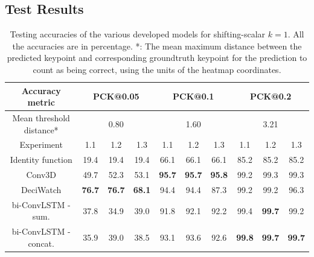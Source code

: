 \documentclass[./main.tex]{subfiles}
\begin{document}
\subsection{Test Results}
\begin{table}[htbp]
    \begin{tabular}{c||ccc|ccc|ccc}
        \hline
        Accuracy metric & \multicolumn{3}{c}{PCK@0.05} & \multicolumn{3}{c}{PCK@0.1} & \multicolumn{3}{c}{PCK@0.2} \\
        \hline
        Mean threshold distance* & \multicolumn{3}{c}{0.80} & \multicolumn{3}{c}{1.60} & \multicolumn{3}{c}{3.21} \\
        \hline
        Experiment & 1.1 & 1.2 & 1.3 & 1.1 & 1.2 & 1.3 & 1.1 & 1.2 & 1.3 \\
        \hline
        \hline
        Identity function & 19.4 & 19.4 & 19.4 & 66.1 & 66.1 & 66.1 & 85.2 & 85.2 & 85.2 \\
        Conv3D & 49.7 & 52.3 & 53.1 & \textbf{95.7} & \textbf{95.7} & \textbf{95.8} & 99.2 & 99.3 & 99.3 \\
        DeciWatch & \textbf{76.7} & \textbf{76.7} & \textbf{68.1} & 94.4 & 94.4 & 87.3 & 99.2 & 99.2 & 96.3 \\
        bi-ConvLSTM - sum. & 37.8 & 34.9 & 39.0 & 91.8 & 92.1 & 92.2 & 99.4 & \textbf{99.7} & 99.2 \\
        bi-ConvLSTM - concat. & 35.9 & 39.0 & 38.5 & 93.1 & 93.6 & 92.6 & \textbf{99.8} & \textbf{99.7} & \textbf{99.7} \\
        \hline
    \end{tabular}
    \caption{Testing accuracies of the various developed models for shifting-scalar $k = 1$. All the accuracies are in percentage. *: The mean maximum distance between the predicted keypoint and corresponding groundtruth keypoint for the prediction to count as being correct, using the units of the heatmap coordinates.}
    \label{tab:finetune_test_accs_1}
\end{table}
\end{document}

